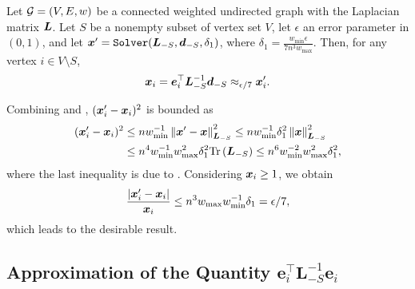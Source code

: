 \documentclass[10pt,twocolumn,twoside]{IEEEtran}
\begin{document}
\begin{lemma}\label{lem:approx-numer}
    Let \(\mathcal{G}=(V,E,w)\) be a connected weighted undirected graph with the Laplacian matrix \(\boldsymbol{L}\). Let  \(S\) be a nonempty subset of vertex set $V$, let $\epsilon$ an error parameter in  $(0,1)$, and let \(\boldsymbol{x}'=\mathtt{Solver}(\boldsymbol{L}_{-S},\boldsymbol{d}_{-S},\delta_1)\), where \(\delta_1=\frac{w_{\min}\epsilon}{7n^3w_{\max}}\). Then, for any vertex \(i\in V\setminus S\),
    \begin{equation}\label{eq:approx-numer}
        \boldsymbol{x}_i=\boldsymbol{e}_i^\top\boldsymbol{L}_{-S}^{-1}\boldsymbol{d}_{-S}\approx_{\epsilon/7}\boldsymbol{x}'_i.
    \end{equation}
\end{lemma}
\begin{IEEEproof}
    Combining  and , \((\boldsymbol{x}'_i-\boldsymbol{x}_i)^2\) is bounded  as
    \begin{align*}
        (\boldsymbol{x}'_i-\boldsymbol{x}_i)^2
         & \le nw_{\min}^{-1}\left\Vert\boldsymbol{x}'-\boldsymbol{x}\right\Vert^2_{\boldsymbol{L}_{-S}}
        \le nw_{\min}^{-1}\delta_1^2\left\Vert\boldsymbol{x}\right\Vert^2_{\boldsymbol{L}_{-S}}        \\
         & \le n^4w_{\min}^{-1}w_{\max}^2\delta_1^2\mathrm{Tr}\left(\boldsymbol{L}_{-S}\right)
        \le n^6w_{\min}^{-2}w_{\max}^2\delta_1^2,
    \end{align*}
    where the last inequality is due to .
    Considering \(\boldsymbol{x}_i\ge1\), we obtain
    \begin{equation*}
        \frac{\left|\boldsymbol{x}'_i-\boldsymbol{x}_i \right|}{\boldsymbol{x}_i}\le n^3w_{\max}w_{\min}^{-1}\delta_1=\epsilon/7,
    \end{equation*}
    which leads to the desirable  result.
\end{IEEEproof}



\subsection{Approximation of the Quantity $\mathbf{e}_i^\top \mathbf{L}_{-S}^{-1}\mathbf{e}_i$}
\end{document}

